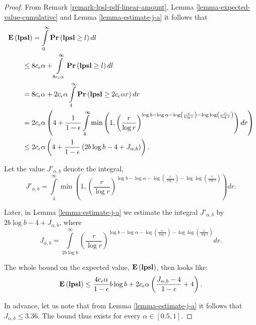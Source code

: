 \begin{proof}
From Remark \ref{remark-lpsl-pdf-linear-amount}, Lemma \ref{lemma-expected-value-cumulative} and Lemma \ref{lemma-estimate-j-a} it follows that
\[
\begin{split}
& \mathbf{E}\left(\mathbf{lpsl}\right)
	= \int\limits_0^\infty \mathbf{Pr}\left(\mathbf{lpsl} \geq l\right) dl \\ 
	& \qquad \leq 8 c_\epsilon \alpha + \int\limits_{8 c_\epsilon \alpha}^\infty \mathbf{Pr}\left(\mathbf{lpsl} \geq l\right) dl \\ 
	& \qquad = 8c_\epsilon \alpha + 2 c_\epsilon \alpha \int\limits_{4}^\infty \mathbf{Pr}\left(\mathbf{lpsl} \geq 2c_\epsilon \alpha r\right) dr \\
	& \qquad = 2c_\epsilon \alpha \left(4 + \frac{1}{1 - \epsilon} \int\limits_{4}^\infty \min\left(1, \left(\frac{r}{\log r}\right)^{\log b - \log \alpha - \log \left(\frac{r}{\log r}\right) - \log \log \left(\frac{r}{\log r}\right)}\right) dr \right) \\ 
	& \qquad \leq 2c_\epsilon \alpha \left( 4 + \frac{1}{1-\epsilon}\left( 2 b \log b - 4 + J_{\alpha, b} \right) \right) \text{.}
\end{split}
\]

Let the value $J'_{\alpha, b}$ denote the integral,
\begin{equation}
\label{equality-j-prime-a-b}
J'_{\alpha, b} = \int\limits_{4}^\infty \min\left(1, \left(\frac{r}{\log r}\right)^{\log b - \log \alpha - \log \left(\frac{r}{\log r}\right) - \log \log \left(\frac{r}{\log r}\right)}\right) dr \text{.}
\end{equation}

Later, in Lemma \ref{lemma-estimate-j-a} we estimate the integral $J'_{\alpha, b}$ by $2 b \log b - 4 +  J_{\alpha, b}$, where
\begin{equation}
\label{equality-j-a-b}
J_{\alpha, b} = \int\limits_{2 b \log b}^\infty \left(\frac{r}{\log r}\right)^{\log b - \log \alpha - \log \left(\frac{r}{\log r}\right) - \log \log \left(\frac{r}{\log r}\right)} dr \text{.}
\end{equation}

The whole bound on the expected value, $\mathbf{E}\left(\mathbf{lpsl}\right)$, then looks like:
\[
\mathbf{E}\left(\mathbf{lpsl}\right) \leq \frac{4 c_\epsilon \alpha}{1 - \epsilon} b \log b + 2 c_\epsilon \alpha \left( \frac{J_{\alpha, b} - 4}{1 - \epsilon} + 4 \right) \text{.}
\]

In advance, let us note that from Lemma \ref{lemma-estimate-j-a} it follows that $J_{\alpha, b} \leq 3.36$. The bound thus exists for every $\alpha \in [0.5, 1]$.
\end{proof}

